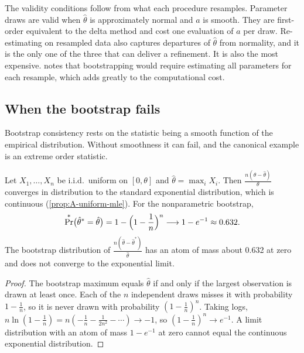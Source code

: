 The validity conditions follow from what each procedure resamples. Parameter draws are valid when $\hat\theta$ is
approximately normal and $a$ is smooth. They are first-order equivalent to the delta method and cost one evaluation
of $a$ per draw. Re-estimating on resampled data also captures departures of $\hat\theta$ from normality, and it is
the only one of the three that can deliver a refinement. It is also the most expensive. \citet[p.~733,
n.~33]{Gentzkow2007} notes that bootstrapping would require estimating all parameters for each resample, which adds
greatly to the computational cost.

\subsection{When the bootstrap fails}\label{sec:A-boot-fail}

Bootstrap consistency rests on the statistic being a smooth function of the empirical distribution. Without
smoothness it can fail, and the canonical example is an extreme order statistic.

\begin{proposition}\label{prop:A-boot-max}
Let $X_1, \dots, X_n$ be i.i.d.\ uniform on $[0, \theta]$ and $\hat\theta = \max_iX_i$. Then
$\frac{n(\theta - \hat\theta)}{\theta}$ converges in distribution to the standard exponential distribution, which is
continuous (\cref{prop:A-uniform-mle}). For the nonparametric bootstrap,
\begin{equation*}
  \Pr^*\bigl(\hat\theta^* = \hat\theta\bigr) = 1 - \Bigl(1 - \frac{1}{n}\Bigr)^n \longrightarrow 1 - e^{-1} \approx 0.632.
\end{equation*}
The bootstrap distribution of $\frac{n(\hat\theta - \hat\theta^*)}{\hat\theta}$ has an atom of mass about 0.632 at
zero and does not converge to the exponential limit.
\end{proposition}

\begin{proof}
The bootstrap maximum equals $\hat\theta$ if and only if the largest observation is drawn at least once. Each of the
$n$ independent draws misses it with probability $1 - \frac{1}{n}$, so it is never drawn with probability
$(1 - \frac{1}{n})^n$. Taking logs, $n\ln(1 - \frac{1}{n}) = n(-\frac{1}{n} - \frac{1}{2n^2} - \cdots) \to -1$, so
$(1 - \frac{1}{n})^n \to e^{-1}$. A limit distribution with an atom of mass $1 - e^{-1}$ at zero cannot equal the
continuous exponential distribution.
\end{proof}

